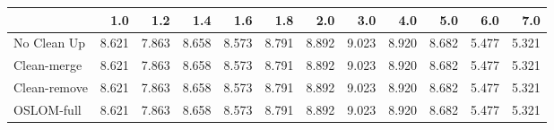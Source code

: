 \begin{tabular}{lrrrrrrrrrrr}
\toprule
{} &   1.0 &   1.2 &   1.4 &   1.6 &   1.8 &   2.0 &   3.0 &   4.0 &   5.0 &   6.0 &   7.0 \\
\midrule
No Clean Up  & 8.621 & 7.863 & 8.658 & 8.573 & 8.791 & 8.892 & 9.023 & 8.920 & 8.682 & 5.477 & 5.321 \\
Clean-merge  & 8.621 & 7.863 & 8.658 & 8.573 & 8.791 & 8.892 & 9.023 & 8.920 & 8.682 & 5.477 & 5.321 \\
Clean-remove & 8.621 & 7.863 & 8.658 & 8.573 & 8.791 & 8.892 & 9.023 & 8.920 & 8.682 & 5.477 & 5.321 \\
OSLOM-full   & 8.621 & 7.863 & 8.658 & 8.573 & 8.791 & 8.892 & 9.023 & 8.920 & 8.682 & 5.477 & 5.321 \\
\bottomrule
\end{tabular}
